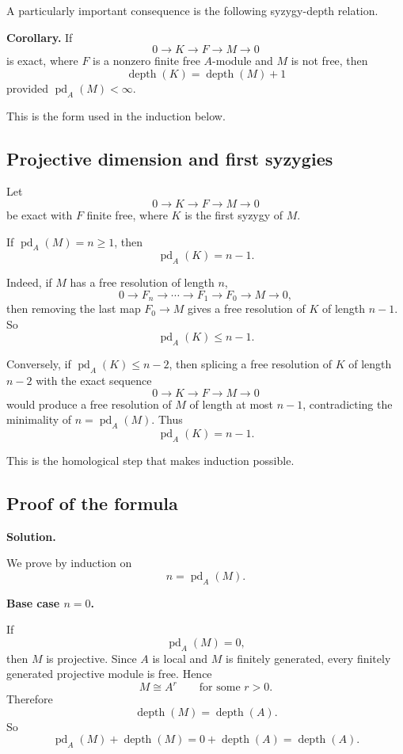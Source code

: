 \documentclass[12pt,a4paper]{article}
\theoremstyle{notespace}
\begin{document}
A particularly important consequence is the following syzygy-depth relation.

\medskip

\textbf{Corollary.}
If
\[
0 \longrightarrow K \longrightarrow F \longrightarrow M \longrightarrow 0
\]
is exact, where \(F\) is a nonzero finite free \(A\)-module and \(M\) is not free, then
\[
\operatorname{depth}(K)=\operatorname{depth}(M)+1
\]
provided \(\operatorname{pd}_A(M)<\infty\).

This is the form used in the induction below.

\subsection{Projective dimension and first syzygies}

Let
\[
0 \longrightarrow K \longrightarrow F \longrightarrow M \longrightarrow 0
\]
be exact with \(F\) finite free, where \(K\) is the first syzygy of \(M\).

If \(\operatorname{pd}_A(M)=n\ge 1\), then
\[
\operatorname{pd}_A(K)=n-1.
\]

Indeed, if \(M\) has a free resolution of length \(n\),
\[
0 \longrightarrow F_n \longrightarrow \cdots \longrightarrow F_1 \longrightarrow F_0 \longrightarrow M \longrightarrow 0,
\]
then removing the last map \(F_0\to M\) gives a free resolution of \(K\) of length \(n-1\). So
\[
\operatorname{pd}_A(K)\le n-1.
\]

Conversely, if \(\operatorname{pd}_A(K)\le n-2\), then splicing a free resolution of \(K\) of length \(n-2\) with the exact sequence
\[
0 \longrightarrow K \longrightarrow F \longrightarrow M \longrightarrow 0
\]
would produce a free resolution of \(M\) of length at most \(n-1\), contradicting the minimality of \(n=\operatorname{pd}_A(M)\). Thus
\[
\operatorname{pd}_A(K)=n-1.
\]

This is the homological step that makes induction possible.

\subsection{Proof of the formula}

\textbf{Solution.}

We prove by induction on
\[
n=\operatorname{pd}_A(M).
\]

\medskip

\textbf{Base case \(n=0\).}

If
\[
\operatorname{pd}_A(M)=0,
\]
then \(M\) is projective. Since \(A\) is local and \(M\) is finitely generated, every finitely generated projective module is free. Hence
\[
M\cong A^r
\qquad \text{for some } r>0.
\]
Therefore
\[
\operatorname{depth}(M)=\operatorname{depth}(A).
\]
So
\[
\operatorname{pd}_A(M)+\operatorname{depth}(M)
=
0+\operatorname{depth}(A)
=
\operatorname{depth}(A).
\]
\end{document}
